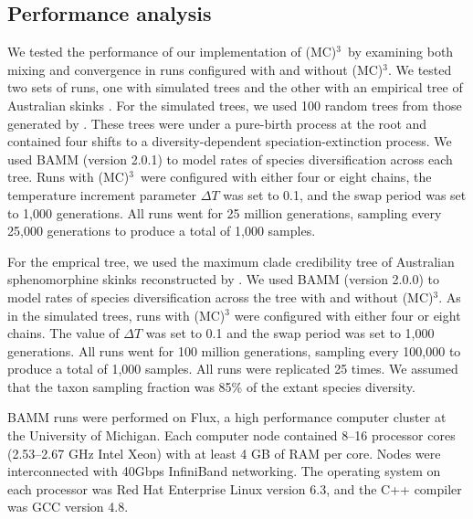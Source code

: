 \documentclass[12pt]{article}
\newcommand{\MCMCMC}{(MC)$^{3}$}
\begin{document}
\subsection*{Performance analysis}

We tested the performance of our implementation of \MCMCMC\ 
by examining both mixing and convergence in runs
configured with and without \MCMCMC.
%
We tested two sets of runs, one with simulated trees
and the other with an empirical tree of Australian skinks \citep{rab14sysbio}.
%
For the simulated trees, we used 100 random trees
from those generated by \citet{rab14plos}.
%
These trees were under a pure-birth process at the root and
contained four shifts to a diversity-dependent speciation-extinction process.
%
We used BAMM (version 2.0.1) to model rates of species diversification
across each tree.
%
Runs with \MCMCMC\ were configured with either four or eight chains,
the temperature increment parameter $\Delta T$ was set to 0.1,
and the swap period was set to 1,000 generations.
%
All runs went for 25 million generations,
sampling every 25,000 generations to produce a total of 1,000 samples.


For the emprical tree, we used the maximum clade credibility tree
of Australian sphenomorphine skinks reconstructed by \citet{rab14sysbio}.
%
We used BAMM (version 2.0.0) to model rates of species diversification
across the tree with and without \MCMCMC.
%
As in the simulated trees, runs with \MCMCMC
were configured with either four or eight chains.
%
The value of $\Delta T$ was set to 0.1
and the swap period was set to 1,000 generations.
%
All runs went for 100 million generations,
sampling every 100,000 to produce a total of 1,000 samples.
%
All runs were replicated 25 times.
%
We assumed that the taxon sampling fraction was 85\%
of the extant species diversity.


BAMM runs were performed on Flux,
a high performance computer cluster at the University of Michigan.
%
Each computer node contained 8--16 processor cores
(2.53--2.67 GHz Intel Xeon) with at least 4 GB of RAM per core.
%
Nodes were interconnected with 40Gbps InfiniBand networking.
%
The operating system on each processor
was Red Hat Enterprise Linux version 6.3,
and the C++ compiler was GCC version 4.8.
\end{document}
